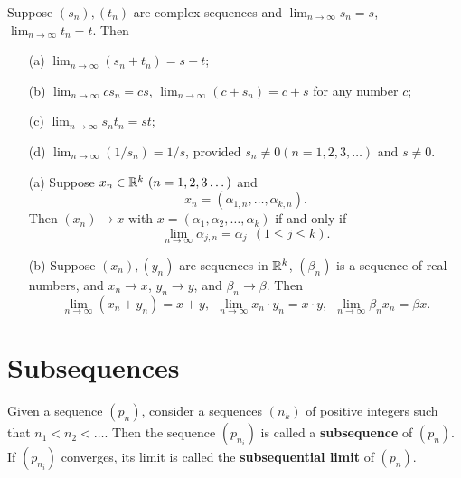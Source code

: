 \documentclass[11pt,a4paper]{book}
\begin{document}
\begin{theorem}[3.3]
   Suppose \( ({s}_{n}), ({t}_{n}) \) are complex sequences and \( \lim_{ n \to \infty  }  {s}_{n} = s  \), \( \lim_{ n \to \infty  }  {t}_{n} = t  \). Then  
   \begin{enumerate}
       \item[(a)] \( \lim_{ n \to \infty  }  ({s}_{n} + {t}_{n}) = s + t  \);
        \item[(b)] \( \lim_{ n \to \infty  }  c {s}_{n} = cs  \), \( \lim_{ n \to \infty  }  (c + {s}_{n}) = c + s  \) for any number \( c  \);
        \item[(c)] \( \lim_{ n \to \infty  }  {s}_{n} {t}_{n} = s t    \);
        \item[(d)] \( \lim_{ n \to \infty  }  (1 / s_{n}) = 1/s \), provided \( {s}_{n} \neq 0 (n = 1,2,3,\dots)  \) and \( s \neq 0  \).
   \end{enumerate}
\end{theorem}

\begin{theorem}[3.4]
    \begin{enumerate}
        \item[(a)] Suppose \( {x}_{n} \in \mathbb{R}^{k} \  (n = 1,2,3 \dots ) \) and 
            \[  {x}_{n} = ({\alpha}_{1,n}, \dots , {\alpha}_{k,n}). \] 
            Then \( ({x}_{n}) \to x  \) with \( x =  ({\alpha}_{1}, {\alpha}_{2}, \dots , {\alpha}_{k}) \) if and only if
            \[  \lim_{ n \to \infty  }  {\alpha}_{j, n } = {\alpha}_{j} \ \ (1 \leq j \leq k ). \]
        \item[(b)] Suppose \( ({x}_{n}), ({y}_{n}) \) are sequences in \( \mathbb{R}^{k } \), \( ({\beta}_{n}) \) is a sequence of real numbers, and \( {x}_{n} \to x  \), \( {y}_{n} \to y  \), and \( {\beta}_{n} \to \beta  \). Then
            \[  \lim_{ n \to \infty  }  ({x}_{n} + {y}_{n}) = x + y, \ \ \lim_{ n \to \infty  }  {x}_{n} \cdot {y}_{n} = x \cdot y , \ \ \lim_{ n \to \infty  }  {\beta}_{n} {x}_{n} = \beta x. \]
    \end{enumerate}
\end{theorem}

\section{Subsequences}

\begin{definition}[3.5]
   Given a sequence \( ({p}_{n}) \), consider a sequences \( ({n}_{k}) \) of positive integers such that \( {n}_{1} < {n}_{2} < \dots  \). Then the sequence \( ({p}_{{n}_{i}}) \) is called a \textbf{subsequence} of \( ({p}_{n}) \). If \( ({p}_{{n}_{i}}) \) converges, its limit is called the \textbf{subsequential limit} of \( ({p}_{n}) \). 
\end{definition}
\end{document}
